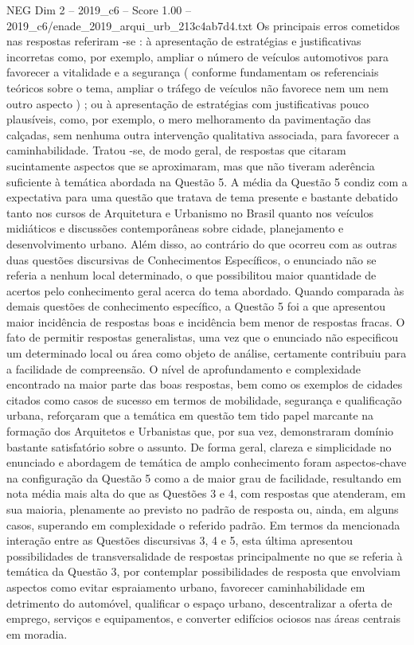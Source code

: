 \begin{textsample}{NEG Dim 2 – 2019\_c6 – Score 1.00 – 2019\_c6/enade\_2019\_arqui\_urb\_213c4ab7d4.txt}
Os principais erros cometidos nas respostas referiram -se : à apresentação de estratégias e justificativas incorretas como, por exemplo, ampliar o número de veículos automotivos para favorecer a vitalidade e a segurança ( conforme fundamentam os referenciais teóricos sobre o tema, ampliar o tráfego de veículos não favorece nem um nem outro aspecto ) ; ou à apresentação de estratégias com justificativas pouco plausíveis, como, por exemplo, o mero melhoramento da pavimentação das calçadas, sem nenhuma outra intervenção qualitativa associada, para favorecer a caminhabilidade.
Tratou -se, de modo geral, de respostas que citaram sucintamente aspectos que se aproximaram, mas que não tiveram aderência suficiente à temática abordada na Questão 5.
A média da Questão 5 condiz com a expectativa para uma questão que tratava de tema presente e bastante debatido tanto nos cursos de Arquitetura e Urbanismo no Brasil quanto nos veículos midiáticos e discussões contemporâneas sobre cidade, planejamento e desenvolvimento urbano.
Além disso, ao contrário do que ocorreu com as outras duas questões discursivas de Conhecimentos Específicos, o enunciado não se referia a nenhum local determinado, o que possibilitou maior quantidade de acertos pelo conhecimento geral acerca do tema abordado.
Quando comparada às demais questões de conhecimento específico, a Questão 5 foi a que apresentou maior incidência de respostas boas e incidência bem menor de respostas fracas.
O fato de permitir respostas generalistas, uma vez que o enunciado não especificou um determinado local ou área como objeto de análise, certamente contribuiu para a facilidade de compreensão.
O nível de aprofundamento e complexidade encontrado na maior parte das boas respostas, bem como os exemplos de cidades citados como casos de sucesso em termos de mobilidade, segurança e qualificação urbana, reforçaram que a temática em questão tem tido papel marcante na formação dos Arquitetos e Urbanistas que, por sua vez, demonstraram domínio bastante satisfatório sobre o assunto.
De forma geral, clareza e simplicidade no enunciado e abordagem de temática de amplo conhecimento foram aspectos-chave na configuração da Questão 5 como a de maior grau de facilidade, resultando em nota média mais alta do que as Questões 3 e 4, com respostas que atenderam, em sua maioria, plenamente ao previsto no padrão de resposta ou, ainda, em alguns casos, superando em complexidade o referido padrão.
Em termos da mencionada interação entre as Questões discursivas 3, 4 e 5, esta última apresentou possibilidades de transversalidade de respostas principalmente no que se referia à temática da Questão 3, por contemplar possibilidades de resposta que envolviam aspectos como evitar espraiamento urbano, favorecer caminhabilidade em detrimento do automóvel, qualificar o espaço urbano, descentralizar a oferta de emprego, serviços e equipamentos, e converter edifícios ociosos nas áreas centrais em moradia.

\end{textsample}
